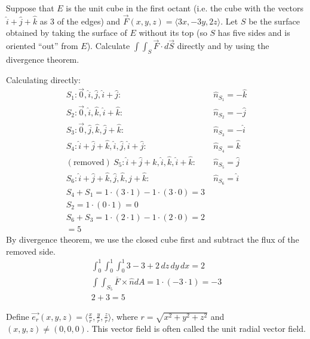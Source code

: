 \documentclass[12pt]{exam}
\begin{document}
\begin{questions}
\question Suppose that $E$ is the unit cube in the first octant (i.e. the cube with the vectors $\hat{i} + \hat{j} + \hat{k}$ as 3 of the edges) and $\overrightarrow{F} (x, y, z) = \langle 3x, -3y, 2z\rangle$. Let $S$ be the surface obtained by taking the surface of $E$ without its top (so $S$ has five sides and is oriented “out” from $E$). Calculate $\int\int_S \overrightarrow{F} \cdot d \overrightarrow{S}$ directly and by using
the divergence theorem.
    \begin{solution}
        Calculating directly:
        \begin{align*}
            S_1: \overrightarrow{0}, \hat{i}, \hat{j}, \hat{i} + \hat{j}:&\ \hat{n}_{S_1} = -\hat{k} \\
            S_2: \overrightarrow{0}, \hat{i}, \hat{k}, \hat{i} + \hat{k}:&\ \hat{n}_{S_2} = -\hat{j} \\
            S_3: \overrightarrow{0}, \hat{j}, \hat{k}, \hat{j} + \hat{k}:&\ \hat{n}_{S_3} = -\hat{i} \\
            S_4: \hat{i} + \hat{j} + \hat{k}, \hat{i}, \hat{j}, \hat{i} + \hat{j}:&\ \hat{n}_{S_4} = \hat{k} \\
            (\text{removed})\ S_5: \hat{i} + \hat{j} + \hat{k}, \hat{i}, \hat{k}, \hat{i} + \hat{k}:&\ \hat{n}_{S_5} = \hat{j} \\
            S_6: \hat{i} + \hat{j} + \hat{k}, \hat{j}, \hat{k}, \hat{j} + \hat{k}:&\ \hat{n}_{S_6} = \hat{i} \\
            S_4 + S_1 = 1 \cdot (3 \cdot 1) - 1 \cdot (3 \cdot 0) = 3 \\
            S_2 = 1 \cdot (0 \cdot 1) = 0 \\
            S_6 + S_3 = 1 \cdot (2 \cdot 1) - 1 \cdot (2 \cdot 0) = 2 \\
            =\boxed{5}
        \end{align*}
        By divergence theorem, we use the closed cube first and subtract the flux of the removed side.
        \begin{align*}
            \int_{0}^{1}\int_{0}^{1}\int_{0}^{1} 3 - 3 + 2 \,dz\,dy\,dx = 2 \\
            \int\int_{S_5} \overline{F} \times \hat{n} dA = 1 \cdot (-3 \cdot 1) = -3\\
            2 + 3 = \boxed{5}
        \end{align*}
    \end{solution}
    \clearpage
\question Define $ \overrightarrow{e_r}(x, y, z) = \langle \frac{x}{r}, \frac{y}{r}, \frac{z}{r} \rangle$, where $r = \sqrt{x^2 + y^2 + z^2}$ and $(x, y, z) \neq (0, 0, 0)$. This vector field is often called the unit radial vector field.
    \begin{parts}

\end{parts}
\end{questions}
\end{document}
